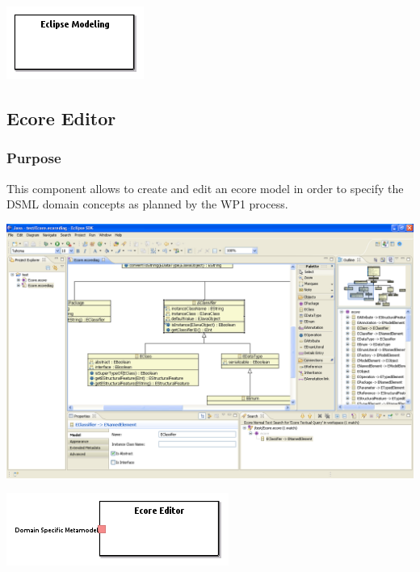 \documentclass{gemoc} %
\begin{document}
\begin{center}
\includegraphics*[trim=0.0cm 0.0cm 0cm 0.0cm, clip=true]{../images/generated/Generated_Eclipse_Modeling.png}
\end{center}




\subsection{Ecore Editor}


\subsubsection{Purpose}
This component allows to create and edit an ecore model in order to specify the DSML domain concepts as planned by the WP1 process.
\begin{center}
\includegraphics*[trim=0.0cm 0.0cm 0cm 0.0cm, clip=true, width=1.0\linewidth]{../images/EcoreDiagramOverview.png}
\end{center}

\begin{center}
\includegraphics*[trim=0.0cm 0.0cm 0cm 0.0cm, clip=true]{../images/generated/Generated_Ecore_Editor.png}
\end{center}
\end{document}
